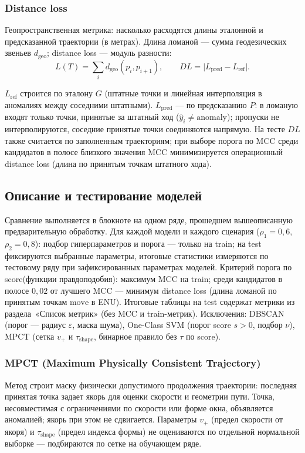 \documentclass[a4paper,12pt]{report}
\begin{document}
	\subsubsection*{Distance loss}
	Геопространственная метрика: насколько расходятся длины эталонной и предсказанной траектории (в метрах). Длина ломаной --- сумма геодезических звеньев $d_{\mathrm{geo}}$; distance loss --- модуль разности:
	\begin{equation*}
		L(T)=\sum_i d_{\mathrm{geo}}(p_i,p_{i+1}), \qquad DL=\bigl|L_{\mathrm{pred}}-L_{\mathrm{ref}}\bigr|.
	\end{equation*}

	$L_{\mathrm{ref}}$ строится по эталону $G$ (штатные точки и линейная интерполяция в аномалиях между соседними штатными). $L_{\mathrm{pred}}$ --- по предсказанию $P$: в ломаную входят только точки, принятые за штатный ход ($\hat y_i \neq \mathrm{anomaly}$); пропуски не интерполируются, соседние принятые точки соединяются напрямую. На тесте $DL$ также считается по заполненным траекториям; при выборе порога по MCC среди кандидатов в полосе близкого значения MCC минимизируется операционный distance loss (длина по принятым точкам штатного хода).

	\subsection{Описание и тестирование моделей}
	Сравнение выполняется в блокноте на одном ряде, прошедшем вышеописанную предварительную обработку. Для каждой модели и каждого сценария ($\rho_1=0{,}6$, $\rho_2=0{,}8$): подбор гиперпараметров и порога --- только на train; на test фиксируются выбранные параметры, итоговые статистики измеряются по тестовому ряду при зафиксированных параметрах моделей. Критерий порога по score(функции правдоподобия): максимум MCC на train; среди кандидатов в полосе $0{,}02$ от лучшего MCC --- минимум distance loss (длина ломаной по принятым точкам $\mathrm{move}$ в ENU). Итоговые таблицы на test содержат метрики из раздела~«Список метрик» (без MCC и train-метрик). Исключения: DBSCAN (порог --- радиус $\varepsilon$, маска шума), One-Class SVM (порог score $s>0$, подбор $\nu$), MPCT (сетка $v_+$ и $\tau_{\mathrm{shape}}$, бинарное правило без $\tau$ по score).

	\subsubsection{MPCT (Maximum Physically Consistent Trajectory)}
	Метод строит маску физически допустимого продолжения траектории: последняя принятая точка задает якорь для оценки скорости и геометрии пути. Точка, несовместимая с ограничениями по скорости или форме окна, объявляется аномалией; якорь при этом не сдвигается. Параметры $v_+$ (предел скорости от якоря) и $\tau_{\mathrm{shape}}$ (предел индекса формы) не оцениваются по отдельной нормальной выборке — подбираются по сетке на обучающем ряде.
\end{document}
